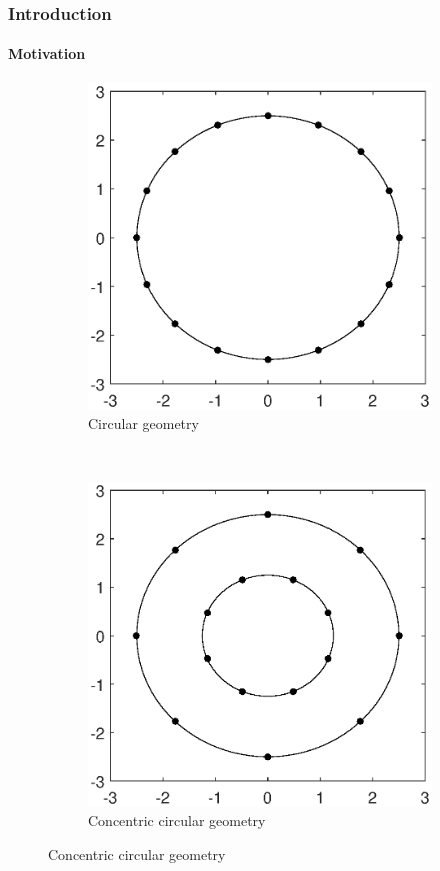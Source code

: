\documentclass[slidestop,usepdftitle=false]{gvvslides}
\begin{document}
\begin{frame}
\frametitle{Introduction}
\framesubtitle{Motivation}
\begin{figure}[h!]
    \centering
    \begin{subfigure}[t]{0.5\columnwidth}
        \centering
         \includegraphics[scale=.25]{LedArrangementCircle}
        \caption{Circular geometry}
\label{fig1:subfig1}        
    \end{subfigure}%
    ~ 
    \begin{subfigure}[t]{0.5\columnwidth}
        \centering
        \includegraphics[scale=.25]{LedArrangementConcircle}
        \caption{Concentric circular geometry}
\label{fig1:subfig2}
    \end{subfigure}


\end{figure}
\end{frame}
\end{document}
